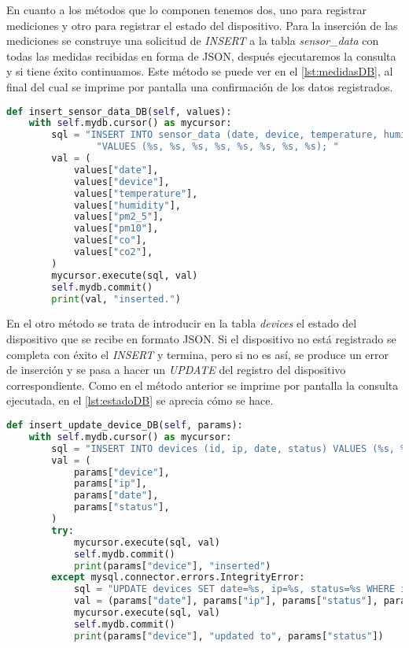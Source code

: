En cuanto a los métodos que lo componen tenemos dos, uno para registrar mediciones y otro para registrar el estado del dispositivo. Para la inserción de las mediciones se construye una solicitud de \textit{INSERT} a la tabla \textit{sensor\_data} con todas las medidas recibidas en forma de JSON, después ejecutaremos la consulta y si tiene éxito continuamos. Este método se puede ver en el \autoref{lst:medidasDB}, al final del cual se imprime por pantalla una confirmación de los datos registrados.
\begin{lstlisting}[language=Python, label=lst:medidasDB, caption=Inserción de mediciones en la base de datos]
def insert_sensor_data_DB(self, values):
    with self.mydb.cursor() as mycursor:
        sql = "INSERT INTO sensor_data (date, device, temperature, humidity, pm2_5, pm10, co, co2)" \
                "VALUES (%s, %s, %s, %s, %s, %s, %s, %s); "
        val = (
            values["date"],
            values["device"],
            values["temperature"],
            values["humidity"],
            values["pm2_5"],
            values["pm10"],
            values["co"],
            values["co2"],
        )
        mycursor.execute(sql, val)
        self.mydb.commit()
        print(val, "inserted.")
\end{lstlisting}

En el otro método se trata de introducir en la tabla \textit{devices} el estado del dispositivo que se recibe en formato JSON. Si el dispositivo no está registrado se completa con éxito el \textit{INSERT} y termina, pero si no es así, se produce un error de inserción y se pasa a hacer un \textit{UPDATE} del registro del dispositivo correspondiente. Como en el método anterior se imprime por pantalla la consulta ejecutada, en el \autoref{lst:estadoDB} se aprecia cómo se hace.
\begin{lstlisting}[language=Python, label=lst:estadoDB, caption=Inserción de estado del dispositivo en la base de datos]
def insert_update_device_DB(self, params):
    with self.mydb.cursor() as mycursor:
        sql = "INSERT INTO devices (id, ip, date, status) VALUES (%s, %s, %s, %s)"
        val = (
            params["device"],
            params["ip"],
            params["date"],
            params["status"],
        )
        try:
            mycursor.execute(sql, val)
            self.mydb.commit()
            print(params["device"], "inserted")
        except mysql.connector.errors.IntegrityError:
            sql = "UPDATE devices SET date=%s, ip=%s, status=%s WHERE id=%s"
            val = (params["date"], params["ip"], params["status"], params["device"])
            mycursor.execute(sql, val)
            self.mydb.commit()
            print(params["device"], "updated to", params["status"])
\end{lstlisting}

